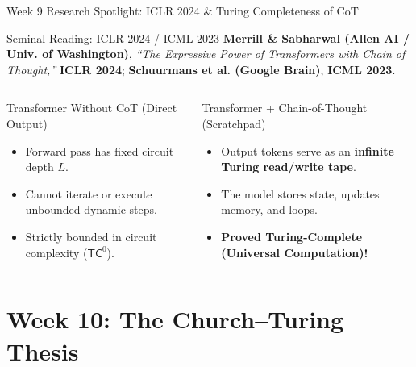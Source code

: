 \documentclass[aspectratio=169,10pt]{beamer}
\begin{document}
\begin{frame}{Week 9 Research Spotlight: ICLR 2024 \& Turing Completeness of CoT}
    \begin{exampleblock}{Seminal Reading: ICLR 2024 / ICML 2023}
        \textbf{Merrill \& Sabharwal (Allen AI / Univ. of Washington)}, \textit{``The Expressive Power of Transformers with Chain of Thought,''} \textbf{ICLR 2024}; \textbf{Schuurmans et al. (Google Brain)}, \textbf{ICML 2023}.
    \end{exampleblock}
    
    \begin{columns}[T]
        \begin{block}{Transformer Without CoT (Direct Output)}
            \begin{itemize}
                \item Forward pass has fixed circuit depth $L$.
                \item Cannot iterate or execute unbounded dynamic steps.
                \item Strictly bounded in circuit complexity ($\textsf{TC}^0$).
            \end{itemize}
        \end{block}
        
        \begin{alertblock}{Transformer + Chain-of-Thought (Scratchpad)}
            \begin{itemize}
                \item Output tokens serve as an \textbf{infinite Turing read/write tape}.
                \item The model stores state, updates memory, and loops.
                \item \textbf{Proved Turing-Complete (Universal Computation)!}
            \end{itemize}
        \end{alertblock}
    \end{columns}
\end{frame}

\section{Week 10: The Church--Turing Thesis}
\end{document}
